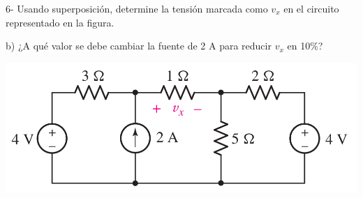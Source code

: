 \documentclass[10pt,letterpaper]{article}
\begin{document}
 6- Usando superposición, determine la tensión marcada como $v_x$ en el circuito representado en la figura. 
 
 b) ¿A qué valor se debe cambiar la fuente de 2 A para reducir $v_x$ en 10\%?
 
  \includegraphics[scale=0.35]{c6}
 
\end{document}
